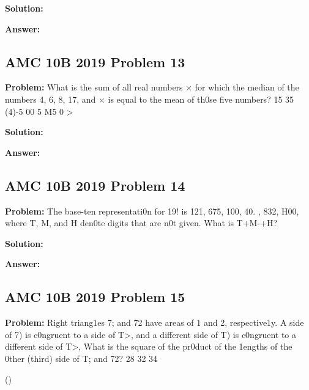 \documentclass{article}
\newenvironment{problem}{\textbf{Problem: }}{\\[0.5em]}
\newenvironment{solution}{\textbf{Solution: }}{\\[0.5em]}
\newenvironment{answer}{\textbf{Answer: }}{\\[0.5em]}
\begin{document}
\begin{solution}
\end{solution}

\begin{answer}
\end{answer}

\subsection{AMC 10B 2019 Problem 13}

\begin{problem}
What is the sum of all real numbers × for which the median of the numbers 4, 6, 8, 17, and × is equal to the mean of th0se five numbers? 15 35 (4)-5 00 5 M5 0 >
\end{problem}

\begin{solution}
\end{solution}

\begin{answer}
\end{answer}

\subsection{AMC 10B 2019 Problem 14}

\begin{problem}
The base-ten representati0n for 19! is 121, 675, 100, 40. , 832, H00, where T, M, and H den0te digits that are n0t given. What is T+M-+H? 
\end{problem}

\begin{solution}
\end{solution}

\begin{answer}
\end{answer}

\subsection{AMC 10B 2019 Problem 15}

\begin{problem}
Right triang1es 7; and 72 have areas of 1 and 2, respective1y. A side of 7) is c0ngruent to a side of T>, and a different side of T) is c0ngruent to a different side of T>, What is the square of the pr0duct of the 1engths of the 0ther (third) side of T; and 72? 28 32 34 \item[(\1)] \2\end{problem}
\end{document}
